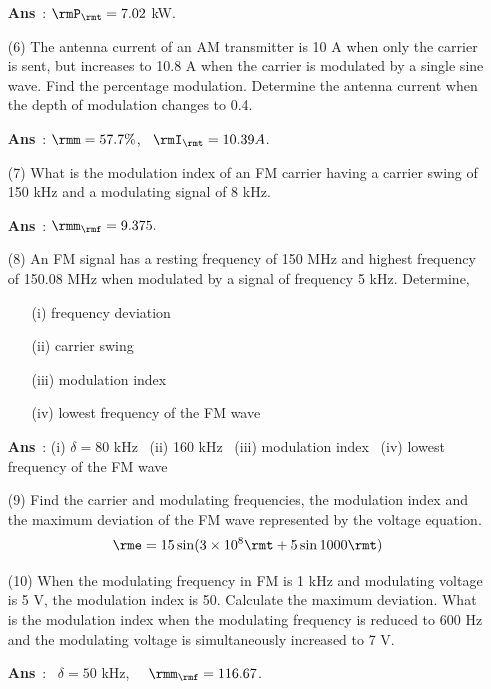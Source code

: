 \begin{enumerate}
{{\textbf{Ans}}~:} $\rmP_\rmt = 7.02$ kW.

\item[(6)] The antenna current of an AM transmitter is 10 A when only
the carrier is sent, but increases to 10.8 A when the carrier is
modulated by a single sine wave. Find the percentage
modulation. Determine the antenna current when the depth of modulation
changes to 0.4.

{{\textbf{Ans}}~:} $\rmm = 57.7\%$, ~$\rmI_\rmt = 10.39 A$.

\item[(7)] What is the modulation index of an FM carrier having a
carrier swing of 150 kHz and a modulating signal of 8 kHz.

{{\textbf{Ans}}~:} $\rmm_\rmf = 9.375.$

\eject

\item[(8)] An FM signal has a resting frequency of 150 MHz and highest
frequency of 150.08 MHz when  modulated by a signal of frequency 5
kHz. Determine, 
\begin{itemize}
\item[(i)] frequency deviation

\item[(ii)] carrier swing 

\item[(iii)] modulation index

\item[(iv)] lowest frequency of the FM wave
\end{itemize}

{{\textbf{Ans}}~:} (i) $\delta =80$ kHz ~(ii) 160 kHz ~(iii)
modulation index ~(iv) lowest frequency of the FM wave

\item[(9)] Find the carrier and modulating frequencies, the modulation
index and the maximum deviation of the FM wave represented by the
voltage equation.
$$
\rme = 15 \sin (3 \times 10^8 \rmt + 5 \sin 1000 \rmt)
$$

\item[(10)] When the modulating frequency in FM is 1 kHz and modulating
voltage is 5 V, the modulation index is 50. Calculate the maximum
deviation. What is the modulation index when the modulating frequency
is reduced to 600 Hz and the modulating voltage is simultaneously
increased to 7 V.

{{\textbf{Ans}}~:} ~$\delta = 50$ kHz, ~~$\rmm_\rmf = 116.67$.
\end{enumerate}

\label{8end}
